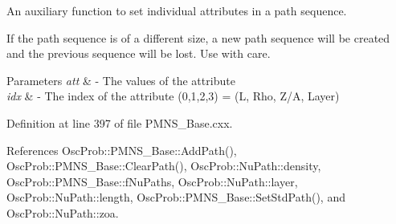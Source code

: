 An auxiliary function to set individual attributes in a path sequence.

If the path sequence is of a different size, a new path sequence will be created and the previous sequence will be lost. Use with care.


\begin{DoxyParams}{Parameters}
{\em att} & -\/ The values of the attribute \\
\hline
{\em idx} & -\/ The index of the attribute (0,1,2,3) = (L, Rho, Z/A, Layer) \\
\hline
\end{DoxyParams}


Definition at line 397 of file P\+M\+N\+S\+\_\+\+Base.\+cxx.



References Osc\+Prob\+::\+P\+M\+N\+S\+\_\+\+Base\+::\+Add\+Path(), Osc\+Prob\+::\+P\+M\+N\+S\+\_\+\+Base\+::\+Clear\+Path(), Osc\+Prob\+::\+Nu\+Path\+::density, Osc\+Prob\+::\+P\+M\+N\+S\+\_\+\+Base\+::f\+Nu\+Paths, Osc\+Prob\+::\+Nu\+Path\+::layer, Osc\+Prob\+::\+Nu\+Path\+::length, Osc\+Prob\+::\+P\+M\+N\+S\+\_\+\+Base\+::\+Set\+Std\+Path(), and Osc\+Prob\+::\+Nu\+Path\+::zoa.


